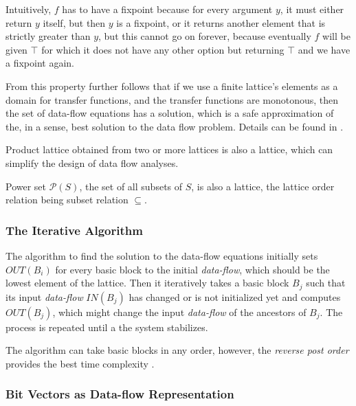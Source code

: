         Intuitively, $f$ has to have a fixpoint because 
        for every argument $y$, it must either return 
        $y$ itself, but then $y$ is a fixpoint, or it 
        returns another element that is strictly 
        greater than $y$, but this cannot go on forever, because eventually 
        $f$ will be given $\top$ for which it does not have 
        any other option but returning $\top$ and we 
        have a fixpoint again.
        
        From this property further follows that if we use a finite 
        lattice's elements as a domain for transfer functions, 
        and the transfer functions are monotonous, then the set of 
        data-flow equations has a solution, which is a safe 
        approximation of the, in a sense, best solution to the 
        data flow problem. Details can be found in \cite{kildall1973unified}.
        
        Product lattice obtained from two or more lattices 
        is also a lattice, which can simplify the design of 
        data flow analyses.

        Power set $\mathcal{P}(S)$, the set of all subsets of $S$, 
        is also a lattice, the lattice order relation 
        being subset relation $\subseteq$.

        \subsubsection*{The Iterative Algorithm}
        
        The algorithm to find the solution to the data-flow equations 
        initially sets $OUT(B_i)$ for every basic block to the initial 
        \emph{data-flow}, which should be the lowest element of the lattice. 
        Then it iteratively takes a basic block $B_j$ such that 
        its input \emph{data-flow} $IN(B_j)$ has changed or is not 
        initialized yet and computes $OUT(B_j)$, which might change 
        the input \emph{data-flow} of the ancestors of $B_j$. 
        The process is repeated until a the system stabilizes. 
        
        The algorithm can take basic blocks in any order, however, 
        the \emph{reverse post order} provides the best time complexity 
        \cite{aho1985compilers}.
        
        \subsubsection*{Bit Vectors as Data-flow Representation}

